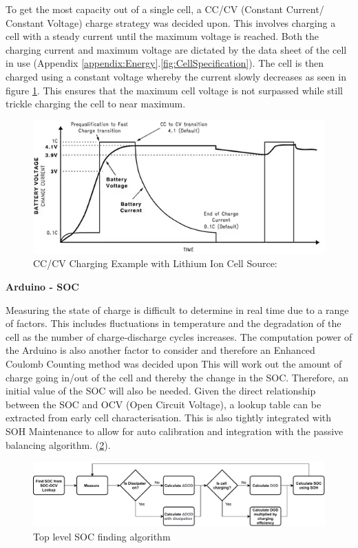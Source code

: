 \documentclass[10pt,twoside]{article}
\begin{document}
To get the most capacity out of a single cell, a CC/CV (Constant Current/ Constant Voltage) charge strategy was decided upon. This involves charging a cell with a steady current until the maximum voltage is reached. Both the charging current and maximum voltage are dictated by the data sheet of the cell in use (Appendix \ref{appendix:Energy}.\ref{fig:CellSpecification}). The cell is then charged using a constant voltage whereby the current slowly decreases as seen in figure \ref{fig:CCCVCharging}. This ensures that the maximum cell voltage is not surpassed while still trickle charging the cell to near maximum.
\begin{figure}[hbt]
    \centering
    \includegraphics[scale = 0.75]{CCCV Charging.PNG}
    \caption{CC/CV Charging Example with Lithium Ion Cell \quad Source: \cite{ADigiKey}}
    \label{fig:CCCVCharging}
\end{figure}

\textbf{Arduino - SOC}

Measuring the state of charge is difficult to determine in real time due to a range of factors. This includes fluctuations in temperature and the degradation of the cell as the number of charge-discharge cycles increases. The computation power of the Arduino is also another factor to consider and therefore an Enhanced Coulomb Counting method \cite{Ng2009EnhancedBatteries} was decided upon This will work out the amount of charge going in/out of the cell and thereby the change in the SOC. Therefore, an initial value of the SOC will also be needed. Given the direct relationship between the SOC and OCV (Open Circuit Voltage), a lookup table can be extracted from early cell characterisation. This is also tightly integrated with SOH Maintenance to allow for auto calibration and integration with the passive balancing algorithm. (\ref{fig:SOCFlow}). 

\begin{figure}[hbt]
    \centering
    \includegraphics[width = \textwidth]{ColoumbCounting (2).pdf}
    \caption{Top level SOC finding algorithm}
    \label{fig:SOCFlow}
\end{figure}
\end{document}

